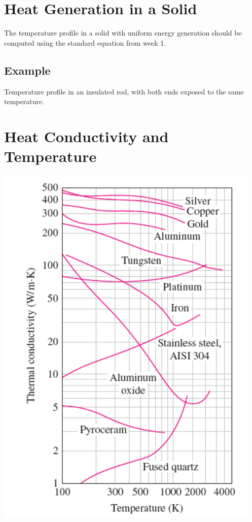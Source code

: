 \documentclass[•]{article}
\begin{document}
\section*{Heat Generation in a Solid}
The temperature profile in a solid with uniform energy generation should be computed using the standard equation from week 1.

\subsection*{Example}
Temperature profile in an insulated rod, with both ends exposed to the same temperature.

\section*{Heat Conductivity and Temperature}
\includegraphics[scale=0.5]{condCurve}
\end{document}
